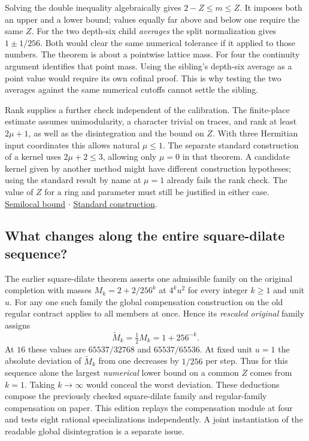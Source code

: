 \documentclass[12pt,letterpaper]{article}
\begin{document}
Solving the double inequality algebraically gives $2-Z\le m\le Z$. It imposes both an upper and a lower bound; values equally far above and below one require the same $Z$. For the two depth-six child \emph{averages} the split normalization gives $1\pm1/256$. Both would clear the same numerical tolerance if it applied to those numbers. The theorem is about a pointwise lattice mass. For four the continuity argument identifies that point mass. Using the sibling's depth-six average as a point value would require its own cofinal proof. This is why testing the two averages against the same numerical cutoffs cannot settle the sibling.

Rank supplies a further check independent of the calibration. The finite-place estimate assumes unimodularity, a character trivial on traces, and rank at least $2\mu+1$, as well as the disintegration and the bound on $Z$. With three Hermitian input coordinates this allows natural $\mu\le1$. The separate standard construction of a kernel uses $2\mu+2\le3$, allowing only $\mu=0$ in that theorem. A candidate kernel given by another method might have different construction hypotheses; using the standard result by name at $\mu=1$ already fails the rank check. The value of $Z$ for a ring and parameter must still be justified in either case. \href{https://github.com/leanprover-community/riemann-hypothesis/blob/e063a923620ee7787b4a1270421478645bf66bdb/src/Lib/SiegelWeil/OneVector/SemilocalDensityBounds.lean#L192-L206}{Semilocal bound} $\cdot$ \href{https://github.com/leanprover-community/riemann-hypothesis/blob/e063a923620ee7787b4a1270421478645bf66bdb/src/Lib/SiegelWeil/OneVector/StandardQuadrics.lean#L142-L151}{Standard construction}.

\subsection{What changes along the entire square-dilate sequence?}
The earlier square-dilate theorem asserts one admissible family on the original completion with masses $M_k=2+2/256^k$ at $4^k u^2$ for every integer $k\ge1$ and unit $u$. For any one such family the global compensation construction on the old regular contract applies to all members at once. Hence its \emph{rescaled original} family assigns
\[
  \widetilde M_k=\tfrac12 M_k=1+256^{-k}.
\]
At $16$ these values are $65537/32768$ and $65537/65536$. At fixed unit $u=1$ the absolute deviation of $\widetilde M_k$ from one decreases by $1/256$ per step. Thus for this sequence alone the largest \emph{numerical} lower bound on a common $Z$ comes from $k=1$. Taking $k\to\infty$ would conceal the worst deviation. These deductions compose the previously checked square-dilate family and regular-family compensation on paper. This edition replays the compensation module at four and tests eight rational specializations independently. A joint instantiation of the readable global disintegration is a separate issue.
\end{document}
